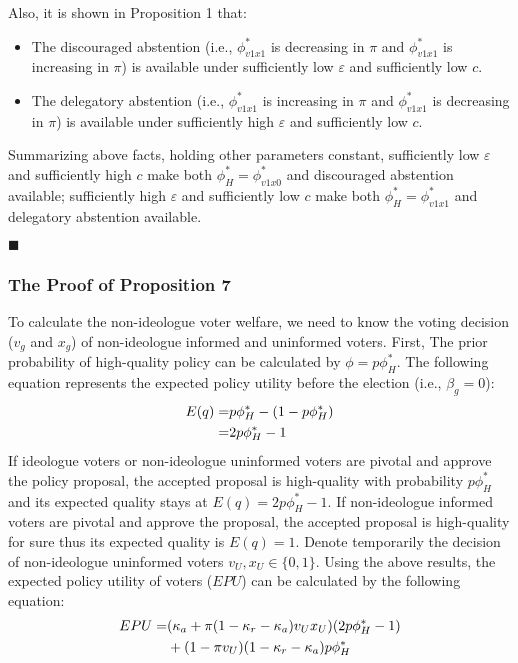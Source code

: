 \par Also, it is shown in Proposition 1 that:
\begin{itemize}
	\item The discouraged abstention (i.e., $\phi^*_{v1x1}$ is decreasing in $\pi$ and $\phi^*_{v1x1}$ is increasing in $\pi$) is available under sufficiently low $\varepsilon$ and sufficiently low $c$. 
	\item The delegatory abstention (i.e., $\phi^*_{v1x1}$ is increasing in $\pi$ and $\phi^*_{v1x1}$ is decreasing in $\pi$) is available under sufficiently high $\varepsilon$ and sufficiently low $c$.
\end{itemize}

\par Summarizing above facts, holding other parameters constant, sufficiently low $\varepsilon$ and sufficiently high $c$ make both $\phi^*_H = \phi^*_{v1x0}$ and discouraged abstention available; sufficiently high $\varepsilon$ and sufficiently low $c$ make both $\phi^*_H = \phi^*_{v1x1}$ and delegatory abstention available. 

\hfill $\blacksquare$

\subsubsection{The Proof of Proposition 7}

\par To calculate the non-ideologue voter welfare, we need to know the voting decision ($v_g$ and $x_g$) of non-ideologue informed and uninformed voters. First, The prior probability of high-quality policy can be calculated by $\phi = p \phi^*_H$. The following equation represents the expected policy utility before the election (i.e., $ \beta_g=0$):
\begin{align*}
E(q) =& p \phi^*_H - (1- p \phi^*_H) \notag \\
=& 2 p \phi^*_H - 1
\end{align*}
If ideologue voters or non-ideologue uninformed voters are pivotal and approve the policy proposal, the accepted proposal is high-quality with probability $p \phi^*_H$ and its expected quality stays at $E(q)=2 p \phi^*_H - 1$. If non-ideologue informed voters are pivotal and approve the proposal, the accepted proposal is high-quality for sure thus its expected quality is $E(q)=1$. Denote temporarily the decision of non-ideologue uninformed voters $v_U, x_U \in \{0, 1\}$. Using the above results, the expected policy utility of voters ($EPU$) can be calculated by the following equation: 
\begin{align*}
EPU =&  ( \kappa_{a} + \pi (1-\kappa_{r}-\kappa_{a})v_U x_U)(2 p \phi^*_H - 1) \notag \\
&+ (1-\pi v_U) (1-\kappa_{r}-\kappa_{a}) p \phi^*_H
\end{align*}

